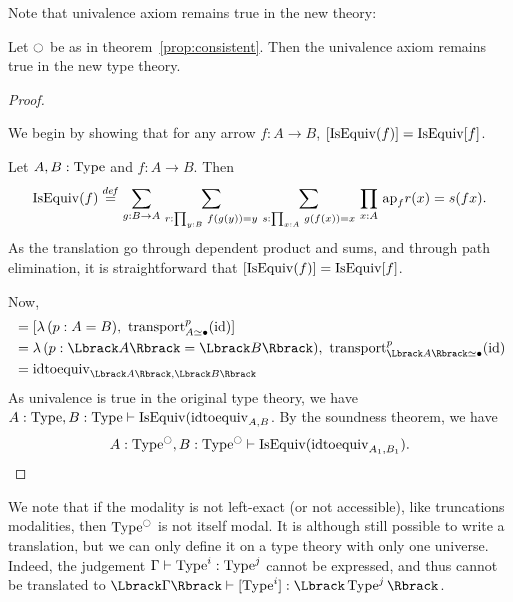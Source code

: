 Note that univalence axiom remains true in the new theory:
\begin{prop}\label{prop:univalence_modal}
  Let $\ocircle$ be as in theorem~\ref{prop:consistent}. Then the
  univalence axiom remains true in the new type theory.
\end{prop}
\begin{proof}

  \begin{lem}
    We begin by showing that for any arrow $f:A \to B$, $[\operatorname{IsEquiv}(f)]
    = \operatorname{IsEquiv}[f]$.
  \end{lem}
  \begin{prooflem}
    Let $A,B:\operatorname{Type}$ and $f:A\to B$. Then 
    \[\operatorname{IsEquiv}(f) \overset{de\hspace{-0.2ex}f}{=} \sum_{g:B\to A}\, \sum_{r:\prod_{y:B}\, f(g(y)) = y}\, \sum_{s:\prod_{x:A}\, g(f(x)) = x}\, \prod_{x:A}\, \mathrm{ap}_{f} r(x) = s(f x).
    \]
    As the translation go through dependent product and sums, and
    through path elimination, it is straightforward that 
    $[\operatorname{IsEquiv}(f)] = \operatorname{IsEquiv} [f]$.
  \end{prooflem}

  Now, 
  \begin{align*}
    [\mathrm{idtoequiv}_{A,B}] 
    &= [\lambda\, (p:A=B),~\transport_{A\simeq \bullet}^p (\id)]  \\
    &= \lambda\, (p:\Lbrack A \Rbrack =\Lbrack B\Rbrack ),~\transport_{\Lbrack
      A\Rbrack \simeq \bullet}^p (\id) \\
    &= \mathrm{idtoequiv}_{\Lbrack A \Rbrack,\Lbrack B \Rbrack}
  \end{align*}
  As univalence is true in the original type theory, we have 
  $A:\operatorname{Type},B:\operatorname{Type} \vdash \operatorname{IsEquiv}(\mathrm{idtoequiv}_{A,B}$. By the
  soundness theorem, we have
  \[A : \operatorname{Type}^{\ocircle},B:\operatorname{Type}^{\ocircle} \vdash
    \operatorname{IsEquiv}(\mathrm{\mathrm{idtoequiv}}_{A_1,B_1}). \]
 

\end{proof}

\begin{rmq}
  We note that if the modality is not left-exact (or not accessible),
  like truncations
  modalities, then $\operatorname{Type}^{\ocircle}$ is not itself modal. It is although
  still possible to write a translation, but we can only define it on
  a type theory with only one universe. Indeed, the judgement $\Gamma
  \vdash \operatorname{Type}^i : \operatorname{Type}^j$ cannot be expressed, and thus cannot be
  translated to $\Lbrack \Gamma \Rbrack \vdash [\Type^i] :
  \Lbrack \Type^j \Rbrack$. 
\end{rmq}

